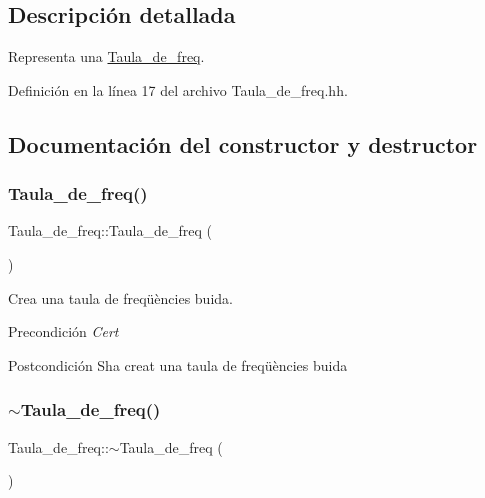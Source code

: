 \subsection{Descripción detallada}
Representa una \hyperlink{class_taula__de__freq}{Taula\+\_\+de\+\_\+freq}. 

Definición en la línea 17 del archivo Taula\+\_\+de\+\_\+freq.\+hh.



\subsection{Documentación del constructor y destructor}
\mbox{\label{class_taula__de__freq_a57b8d780af285f09746da0a96dfd9d61}} 
\subsubsection{\texorpdfstring{Taula\+\_\+de\+\_\+freq()}{Taula\_de\_freq()}}
{\footnotesize\ttfamily Taula\+\_\+de\+\_\+freq\+::\+Taula\+\_\+de\+\_\+freq (\begin{DoxyParamCaption}{ }\end{DoxyParamCaption})}



Crea una taula de freqüències buida. 

\begin{DoxyPrecond}{Precondición}
{\itshape Cert} 
\end{DoxyPrecond}
\begin{DoxyPostcond}{Postcondición}
S\textquotesingle{}ha creat una taula de freqüències buida 
\end{DoxyPostcond}
\mbox{\label{class_taula__de__freq_a046a70a0ea38d03da605998cf99d5335}} 
\subsubsection{\texorpdfstring{$\sim$\+Taula\+\_\+de\+\_\+freq()}{~Taula\_de\_freq()}}
{\footnotesize\ttfamily Taula\+\_\+de\+\_\+freq\+::$\sim$\+Taula\+\_\+de\+\_\+freq (\begin{DoxyParamCaption}{ }\end{DoxyParamCaption})}



